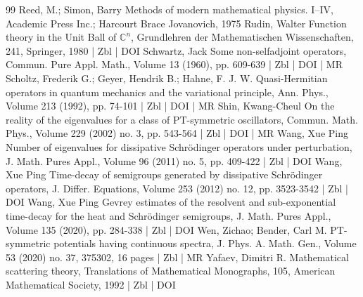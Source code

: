 \begin{thebibliography}{99}
Reed, M.; Simon, Barry Methods of modern mathematical physics. I–IV, Academic Press Inc.; Harcourt Brace Jovanovich, 1975
Rudin, Walter Function theory in the Unit Ball of $\mathbb{C}^n$, Grundlehren der Mathematischen Wissenschaften, 241, Springer, 1980 | Zbl | DOI
Schwartz, Jack Some non-selfadjoint operators, Commun. Pure Appl. Math., Volume 13 (1960), pp. 609-639 | Zbl | DOI | MR
Scholtz, Frederik G.; Geyer, Hendrik B.; Hahne, F. J. W. Quasi-Hermitian operators in quantum mechanics and the variational principle, Ann. Phys., Volume 213 (1992), pp. 74-101 | Zbl | DOI | MR
Shin, Kwang-Cheul On the reality of the eigenvalues for a class of PT-symmetric oscillators, Commun. Math. Phys., Volume 229 (2002) no. 3, pp. 543-564 | Zbl | DOI | MR
Wang, Xue Ping Number of eigenvalues for dissipative Schrödinger operators under perturbation, J. Math. Pures Appl., Volume 96 (2011) no. 5, pp. 409-422 | Zbl | DOI
Wang, Xue Ping Time-decay of semigroups generated by dissipative Schrödinger operators, J. Differ. Equations, Volume 253 (2012) no. 12, pp. 3523-3542 | Zbl | DOI
Wang, Xue Ping Gevrey estimates of the resolvent and sub-exponential time-decay for the heat and Schrödinger semigroups, J. Math. Pures Appl., Volume 135 (2020), pp. 284-338 | Zbl | DOI
Wen, Zichao; Bender, Carl M. PT-symmetric potentials having continuous spectra, J. Phys. A. Math. Gen., Volume 53 (2020) no. 37, 375302, 16 pages | Zbl | MR
Yafaev, Dimitri R. Mathematical scattering theory, Translations of Mathematical Monographs, 105, American Mathematical Society, 1992 | Zbl | DOI
\end{thebibliography}
